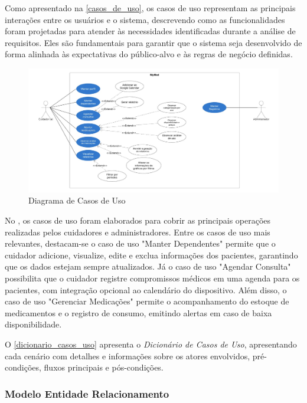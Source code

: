 \documentclass[
	article,			%
	12pt,				%
	oneside,			%
	a4paper,			%
    BIBLATEX,           %
	english,			%
	brazil,				%
	sumario=tradicional
	]{abntex2}
\begin{document}
Como apresentado na \autoref{casos_de_uso}, os casos de uso representam as principais interações entre os usuários e o sistema, descrevendo como as funcionalidades foram projetadas para atender às necessidades identificadas durante a análise de requisitos. Eles são fundamentais para garantir que o sistema seja desenvolvido de forma alinhada às expectativas do público-alvo e às regras de negócio definidas.

\begin{figure}[!htbp]
    \centering
    \includegraphics[width=1.0\linewidth]{assets/figuras/diagrama-casos-uso.jpg}
    \caption{Diagrama de Casos de Uso}
    \label{casos_de_uso}
\end{figure}


No \nomeprojeto, os casos de uso foram elaborados para cobrir as principais operações realizadas pelos cuidadores e administradores. Entre os casos de uso mais relevantes, destacam-se o caso de uso "Manter Dependentes" permite que o cuidador adicione, visualize, edite e exclua informações dos pacientes, garantindo que os dados estejam sempre atualizados. Já o caso de uso "Agendar Consulta" possibilita que o cuidador registre compromissos médicos em uma agenda para os pacientes, com integração opcional ao calendário do dispositivo. Além disso, o caso de uso "Gerenciar Medicações" permite o acompanhamento do estoque de medicamentos e o registro de consumo, emitindo alertas em caso de baixa disponibilidade.

O \autoref{dicionario_casos_uso} apresenta o \textit{Dicionário de Casos de Uso}, apresentando cada cenário com detalhes e informações sobre os atores envolvidos, pré-condições, fluxos principais e pós-condições.


\subsubsection{Modelo Entidade Relacionamento}
\end{document}
